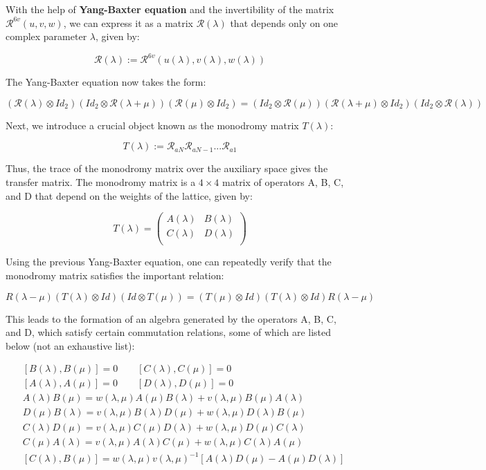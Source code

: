 \documentclass[11pt]{article}
\theoremstyle{definition}
\begin{document}
With the help of \textbf{Yang-Baxter equation} and the invertibility of the matrix \(\mathcal{R}^{6v}(u,v,w)\), we can express it as a matrix \(\mathcal{R}(\lambda)\) that depends only on one complex parameter \(\lambda\), given by:

\[\mathcal{R}(\lambda):=\mathcal{R}^{6v}(u(\lambda),v(\lambda),w(\lambda))\]

The Yang-Baxter equation now takes the form:

\[(\mathcal{R}(\lambda)\otimes Id_2)(Id_2\otimes\mathcal{R}(\lambda+\mu))(\mathcal{R}(\mu)\otimes Id_2)=(Id_2\otimes\mathcal{R}(\mu))(\mathcal{R}(\lambda+\mu)\otimes Id_2)(Id_2\otimes\mathcal{R}(\lambda))\]

Next, we introduce a crucial object known as the monodromy matrix \(T(\lambda)\):

\[T(\lambda):=\mathcal{R}_{aN}\mathcal{R}_{aN-1}...\mathcal{R}_{a1}\]

Thus, the trace of the monodromy matrix over the auxiliary space gives the transfer matrix. The monodromy matrix is a \(4\times 4\) matrix of operators A, B, C, and D that depend on the weights of the lattice, given by:

\[
T(\lambda)=
\begin{pmatrix}
A(\lambda) & B(\lambda) \\
C(\lambda) & D(\lambda) \\
\end{pmatrix}
\]

Using the previous Yang-Baxter equation, one can repeatedly verify that the monodromy matrix satisfies the important relation:


\begin{equation}\label{YBmono}
R(\lambda-\mu)(T(\lambda)\otimes Id)(Id\otimes T(\mu))=(T(\mu)\otimes Id)(T(\lambda)\otimes Id) R(\lambda-\mu)
\end{equation}


This leads to the formation of an algebra generated by the operators A, B, C, and D, which satisfy certain commutation relations, some of which are listed below (not an exhaustive list):

\begin{align}
&[B(\lambda),B(\mu)]=0\qquad [C(\lambda),C(\mu)]=0\\
&[A(\lambda),A(\mu)]=0\qquad [D(\lambda),D(\mu)]=0\\
&A(\lambda)B(\mu)=w(\lambda,\mu)A(\mu)B(\lambda)+v(\lambda,\mu)B(\mu)A(\lambda)\\
&D(\mu)B(\lambda)=v(\lambda,\mu)B(\lambda)D(\mu)+w(\lambda,\mu)D(\lambda)B(\mu)\\
&C(\lambda)D(\mu)=v(\lambda,\mu)C(\mu)D(\lambda)+w(\lambda,\mu)D(\mu)C(\lambda)\\
&C(\mu)A(\lambda)=v(\lambda,\mu)A(\lambda)C(\mu)+w(\lambda,\mu)C(\lambda)A(\mu)\\
&[C(\lambda),B(\mu)]=w(\lambda,\mu)v(\lambda,\mu)^{-1}[A(\lambda)D(\mu)-A(\mu)D(\lambda)]
\end{align}
\end{document}
